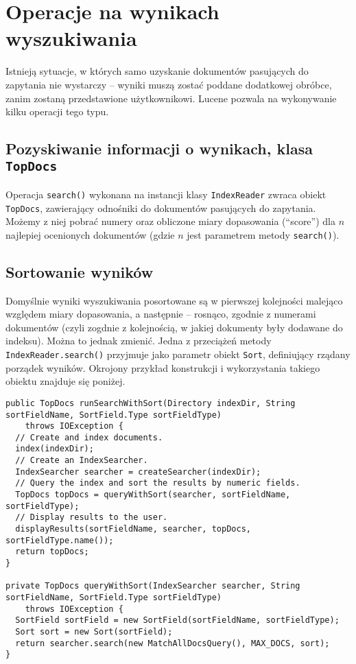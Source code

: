 \chapter{Operacje na wynikach wyszukiwania}

Istnieją sytuacje, w których samo uzyskanie dokumentów pasujących do zapytania nie wystarczy -- wyniki muszą zostać poddane dodatkowej obróbce, zanim zostaną przedstawione użytkownikowi. Lucene pozwala na wykonywanie kilku operacji tego typu.

\section{Pozyskiwanie informacji o wynikach, klasa \texttt{TopDocs}}

Operacja \texttt{search()} wykonana na instancji klasy \texttt{IndexReader} zwraca obiekt \texttt{TopDocs}, zawierający odnośniki do dokumentów pasujących do zapytania. Możemy z niej pobrać numery oraz obliczone miary dopasowania (``score'') dla $n$ najlepiej ocenionych dokumentów (gdzie $n$ jest parametrem metody \texttt{search()}).

\section{Sortowanie wyników}

Domyślnie wyniki wyszukiwania posortowane są w pierwszej kolejności malejąco względem miary dopasowania, a następnie -- rosnąco, zgodnie z numerami dokumentów (czyli zogdnie z kolejnością, w jakiej dokumenty były dodawane do indeksu). Można to jednak zmienić. Jedna z przeciążeń metody \texttt{IndexReader.search()} przyjmuje jako parametr obiekt \texttt{Sort}, definiujący rządany porządek wyników. Okrojony przykład konstrukcji i wykorzystania takiego obiektu znajduje się poniżej.

\begin{lstlisting}
public TopDocs runSearchWithSort(Directory indexDir, String sortFieldName, SortField.Type sortFieldType)
    throws IOException {
  // Create and index documents.  
  index(indexDir);
  // Create an IndexSearcher.
  IndexSearcher searcher = createSearcher(indexDir);
  // Query the index and sort the results by numeric fields.
  TopDocs topDocs = queryWithSort(searcher, sortFieldName, sortFieldType);
  // Display results to the user.
  displayResults(sortFieldName, searcher, topDocs, sortFieldType.name());
  return topDocs;
}

private TopDocs queryWithSort(IndexSearcher searcher, String sortFieldName, SortField.Type sortFieldType)
    throws IOException {
  SortField sortField = new SortField(sortFieldName, sortFieldType);
  Sort sort = new Sort(sortField);
  return searcher.search(new MatchAllDocsQuery(), MAX_DOCS, sort);
}
\end{lstlisting}

